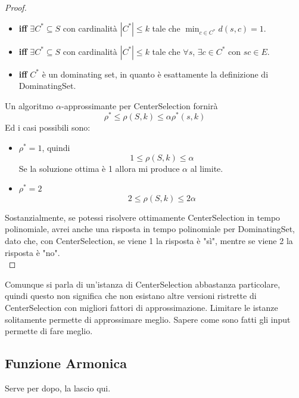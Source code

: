 \begin{proof}
\begin{itemize}[label*=]
		\item \textbf{iff} $\exists C^\ast \subseteq S$ con cardinalità $|C^\ast| \leq k$ tale che $\min_{c \in C^\ast} d(s,c) = 1$.\\
		
		\item \textbf{iff} $\exists C^\ast \subseteq S$ con cardinalità $|C^\ast| \leq k$ tale che $\forall s$,  $\exists c \in C^\ast$ con $sc \in E$.\\
		
		\item \textbf{iff} $C^\ast$ è un dominating set, in quanto è esattamente la definizione di DominatingSet.\\
	\end{itemize}
	
	Un algoritmo $\alpha$-approssimante per CenterSelection fornirà
	$$ \rho^\ast \leq \rho (S,k) \leq \alpha \rho^\ast (s,k) $$
	Ed i casi possibili sono:
	\begin{itemize}
		\item $\rho^\ast = 1$, quindi
		$$ 1 \leq \rho(S,k) \leq \alpha $$
		Se la soluzione ottima è 1 allora mi produce $\alpha$ al limite.\\
		
		\item $\rho^\ast = 2$
		$$ 2 \leq \rho(S,k) \leq 2 \alpha $$
	\end{itemize}
	Sostanzialmente, se potessi risolvere ottimamente CenterSelection in tempo polinomiale, avrei anche una risposta in tempo polinomiale per DominatingSet, dato che, con CenterSelection, se viene 1 la risposta è "sì", mentre se viene 2 la risposta è "no".\\
\end{proof}

Comunque si parla di un'istanza di CenterSelection abbastanza particolare, quindi questo non significa che non esistano altre versioni ristrette di CenterSelection con migliori fattori di approssimazione. Limitare le istanze solitamente permette di approssimare meglio. Sapere come sono fatti gli input permette di fare meglio.\\

\newpage

\subsection*{Funzione Armonica}
Serve per dopo, la lascio qui.\\


